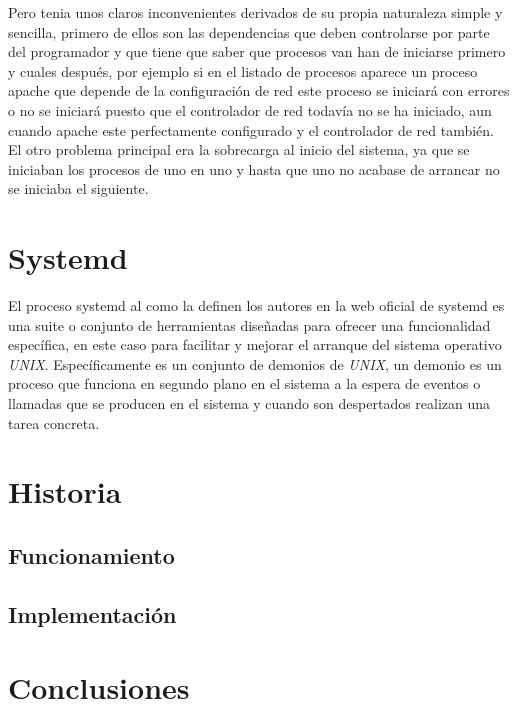Pero tenia unos claros inconvenientes derivados de su propia naturaleza
simple y sencilla, primero de ellos son las dependencias que 
deben controlarse por parte del programador y que tiene que saber que procesos
van han de iniciarse primero y cuales después, por ejemplo si en el listado
de procesos aparece un proceso apache que depende de la configuración de
red este proceso se iniciará con errores o no se iniciará puesto que el 
controlador de red todavía no se ha iniciado, aun cuando apache este 
perfectamente configurado y el controlador de red también. El otro
problema principal era la sobrecarga al inicio del sistema, ya que se 
iniciaban los procesos de uno en uno y hasta que uno no acabase de arrancar
no se iniciaba el siguiente.


\section{Systemd} %

El proceso systemd al como la definen los autores en la web oficial de
systemd \cite{systemd} es una suite o conjunto de herramientas diseñadas
para ofrecer una funcionalidad específica, en este caso para facilitar y
mejorar el arranque del sistema operativo \textit{UNIX}. Específicamente
es un conjunto de demonios de \textit{UNIX}, un demonio \cite{daemons} es un
proceso que funciona en segundo plano en el sistema a la espera de eventos
o llamadas que se producen en el sistema y cuando son despertados realizan
una tarea  concreta. 



\section{Historia}


\subsection{Funcionamiento}

\subsection{Implementación}

\section{Conclusiones}


